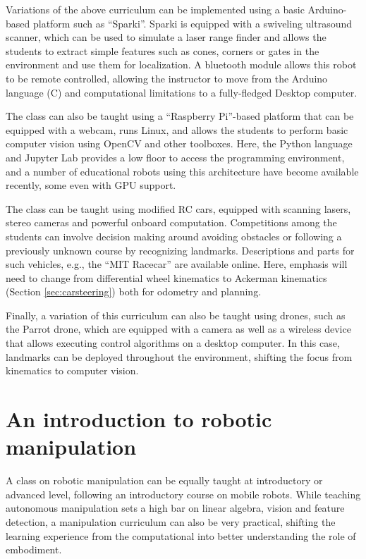 Variations of the above curriculum can be implemented using a basic Arduino-based platform such as ``Sparki''. Sparki is equipped with a swiveling ultrasound scanner, which can be used to simulate a laser range finder and allows the students to extract simple features such as cones, corners or gates in the environment and use them for localization. A bluetooth module allows this robot to be remote controlled, allowing the instructor to move from the Arduino language (C) and computational limitations to a fully-fledged Desktop computer.

The class can also be taught using a ``Raspberry Pi''-based platform that can be equipped with a webcam, runs Linux, and allows the students to perform basic computer vision using OpenCV and other toolboxes. Here, the Python language and Jupyter Lab provides a low floor to access the programming environment, and a number of educational robots using this architecture have become available recently, some even with GPU support.

The class can be taught using modified RC cars, equipped with scanning lasers, stereo cameras and powerful onboard computation. Competitions among the students can involve decision making around avoiding obstacles or following a previously unknown course by recognizing landmarks.
Descriptions and parts for such vehicles, e.g., the ``MIT Racecar'' are available online. Here, emphasis  will need to change from differential wheel kinematics to Ackerman kinematics (Section \ref{sec:carsteering}) both for odometry and planning.

Finally, a variation of this curriculum can also be taught using drones, such as the Parrot drone, which are equipped with a camera as well as a wireless device that allows executing control algorithms on a desktop computer. In this case, landmarks can be deployed throughout the environment, shifting the focus from kinematics to computer vision.


\section{An introduction to robotic manipulation}
A class on robotic manipulation can be equally taught at introductory or advanced level, following an introductory course on mobile robots. While teaching autonomous manipulation sets a high bar on linear algebra, vision and feature detection, a manipulation curriculum can also be very practical, shifting the learning experience from the computational into better understanding the role of embodiment. 

